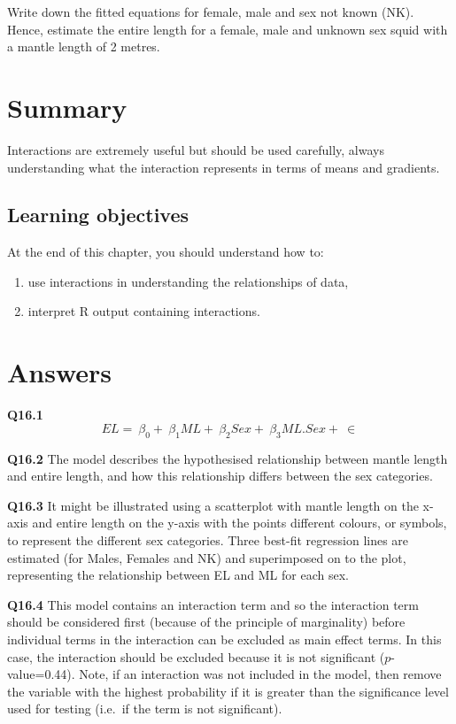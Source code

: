 \documentclass[
  oneside]{krantz}
\providecommand{\tightlist}{%
  \setlength{\itemsep}{0pt}\setlength{\parskip}{0pt}}
\begin{document}
Write down the fitted equations for female, male and sex not known (NK).
Hence, estimate the entire length for a female, male and unknown sex squid with a mantle length of 2 metres.

\hypertarget{SUMinterac}{%
\section{Summary}\label{SUMinterac}}

Interactions are extremely useful but should be used carefully, always understanding what the interaction represents in terms of means and gradients.

\hypertarget{learning-objectives-5}{%
\subsection{Learning objectives}\label{learning-objectives-5}}

At the end of this chapter, you should understand how to:

\begin{enumerate}
\def\labelenumi{\arabic{enumi}.}
\tightlist
\item
  use interactions in understanding the relationships of data,
\item
  interpret R output containing interactions.
\end{enumerate}

\hypertarget{ANSinterac}{%
\section{Answers}\label{ANSinterac}}

\textbf{Q16.1}
\[
EL=\ {\beta{}}_0+\ {\beta{}}_1ML+\ {\beta{}}_2Sex+\ {\beta{}}_3ML.Sex+\ \in{}
\]

\textbf{Q16.2} The model describes the hypothesised relationship between mantle length and entire length, and how this relationship differs between the sex categories.

\textbf{Q16.3} It might be illustrated using a scatterplot with mantle length on the x-axis and entire length on the y-axis with the points different colours, or symbols, to represent the different sex categories. Three best-fit regression lines are estimated (for Males, Females and NK) and superimposed on to the plot, representing the relationship between EL and ML for each sex.

\textbf{Q16.4} This model contains an interaction term and so the interaction term should be considered first (because of the principle of marginality) before individual terms in the interaction can be excluded as main effect terms. In this case, the interaction should be excluded because it is not significant (\(p\)-value=0.44). Note, if an interaction was not included in the model, then remove the variable with the highest probability if it is greater than the significance level used for testing (i.e.~if the term is not significant).
\end{document}
